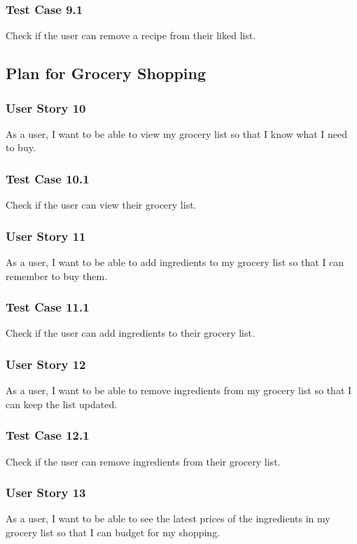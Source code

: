 \documentclass[11pt, letterpaper]{report}
\begin{document}
\subsubsection{Test Case 9.1}
Check if the user can remove a recipe from their liked list.

\subsection{Plan for Grocery Shopping}

\subsubsection{User Story 10}
As a user, I want to be able to view my grocery list so that I know what I need to buy.

\subsubsection{Test Case 10.1}
Check if the user can view their grocery list.

\subsubsection{User Story 11}
As a user, I want to be able to add ingredients to my grocery list so that I can remember to buy them.

\subsubsection{Test Case 11.1}
Check if the user can add ingredients to their grocery list.

\subsubsection{User Story 12}
As a user, I want to be able to remove ingredients from my grocery list so that I can keep the list updated.

\subsubsection{Test Case 12.1}
Check if the user can remove ingredients from their grocery list.

\subsubsection{User Story 13}
As a user, I want to be able to see the latest prices of the ingredients in my grocery list so that I can budget for my shopping.
\end{document}
